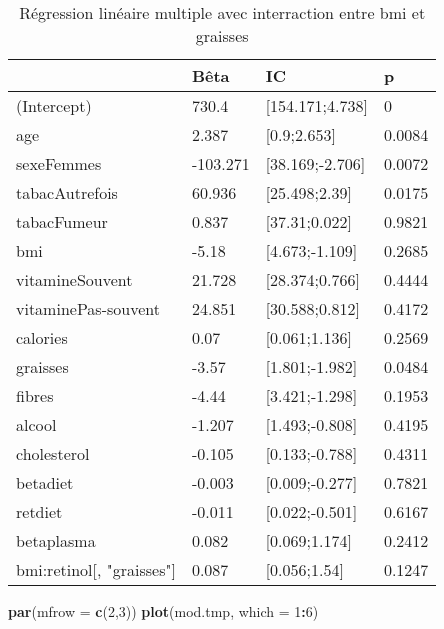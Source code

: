 \documentclass[]{article}
\newenvironment{Shaded}{\begin{snugshade}}{\end{snugshade}}
\newcommand{\KeywordTok}[1]{\textcolor[rgb]{0.13,0.29,0.53}{\textbf{#1}}}
\newcommand{\DataTypeTok}[1]{\textcolor[rgb]{0.13,0.29,0.53}{#1}}
\newcommand{\DecValTok}[1]{\textcolor[rgb]{0.00,0.00,0.81}{#1}}
\newcommand{\OperatorTok}[1]{\textcolor[rgb]{0.81,0.36,0.00}{\textbf{#1}}}
\newcommand{\NormalTok}[1]{#1}
\begin{document}
\begin{table}

\caption{\label{tab:unnamed-chunk-72}Régression linéaire multiple avec interraction entre bmi et graisses}
\centering
\begin{tabular}[t]{l|l|l|l}
\hline
  & Bêta & IC & p\\
\hline
\rowcolor[HTML]{BBD2E1}  (Intercept) & 730.4 & [154.171;4.738] & 0\\
\hline
age & 2.387 & [0.9;2.653] & 0.0084\\
\hline
\rowcolor[HTML]{BBD2E1}  sexeFemmes & -103.271 & [38.169;-2.706] & 0.0072\\
\hline
tabacAutrefois & 60.936 & [25.498;2.39] & 0.0175\\
\hline
\rowcolor[HTML]{BBD2E1}  tabacFumeur & 0.837 & [37.31;0.022] & 0.9821\\
\hline
bmi & -5.18 & [4.673;-1.109] & 0.2685\\
\hline
\rowcolor[HTML]{BBD2E1}  vitamineSouvent & 21.728 & [28.374;0.766] & 0.4444\\
\hline
vitaminePas-souvent & 24.851 & [30.588;0.812] & 0.4172\\
\hline
\rowcolor[HTML]{BBD2E1}  calories & 0.07 & [0.061;1.136] & 0.2569\\
\hline
graisses & -3.57 & [1.801;-1.982] & 0.0484\\
\hline
\rowcolor[HTML]{BBD2E1}  fibres & -4.44 & [3.421;-1.298] & 0.1953\\
\hline
alcool & -1.207 & [1.493;-0.808] & 0.4195\\
\hline
\rowcolor[HTML]{BBD2E1}  cholesterol & -0.105 & [0.133;-0.788] & 0.4311\\
\hline
betadiet & -0.003 & [0.009;-0.277] & 0.7821\\
\hline
\rowcolor[HTML]{BBD2E1}  retdiet & -0.011 & [0.022;-0.501] & 0.6167\\
\hline
betaplasma & 0.082 & [0.069;1.174] & 0.2412\\
\hline
\rowcolor[HTML]{BBD2E1}  bmi:retinol[, "graisses"] & 0.087 & [0.056;1.54] & 0.1247\\
\hline
\end{tabular}
\end{table}

\begin{Shaded}
\begin{Highlighting}[]
\KeywordTok{par}\NormalTok{(}\DataTypeTok{mfrow =} \KeywordTok{c}\NormalTok{(}\DecValTok{2}\NormalTok{,}\DecValTok{3}\NormalTok{))}
\KeywordTok{plot}\NormalTok{(mod.tmp, }\DataTypeTok{which =} \DecValTok{1}\OperatorTok{:}\DecValTok{6}\NormalTok{)}
\end{Highlighting}
\end{Shaded}
\end{document}
